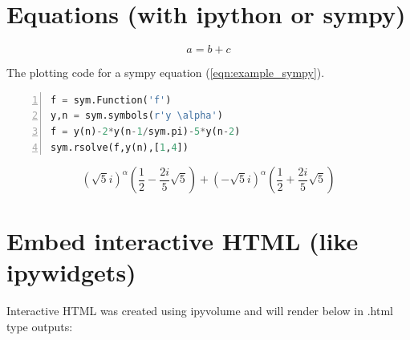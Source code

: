 \documentclass[10pt,parskip=half,
	toc=sectionentrywithdots,
	bibliography=totocnumbered,
	captions=tableheading,numbers=noendperiod]{scrartcl}
\begin{document}
\section{Equations (with ipython or
sympy)}\label{equations-with-ipython-or-sympy}

    \begin{equation}\label{eqn:example_ipy}	
    	 a = b+c 
        \end{equation}

\begin{codecell}[H]

    \caption{The plotting code for a sympy equation (\cref{eqn:example_sympy}).}\label{code:example_sym}\begin{lstlisting}[language=Python,numbers=left,xleftmargin=20pt,xrightmargin=5pt,belowskip=5pt,aboveskip=5pt]
f = sym.Function('f')
y,n = sym.symbols(r'y \alpha')
f = y(n)-2*y(n-1/sym.pi)-5*y(n-2)
sym.rsolve(f,y(n),[1,4])
\end{lstlisting}\end{codecell}

    \begin{equation}\label{eqn:example_sympy}	
    	\left(\sqrt{5} i\right)^{\alpha} \left(\frac{1}{2} - \frac{2 i}{5} \sqrt{5}\right) + \left(- \sqrt{5} i\right)^{\alpha} \left(\frac{1}{2} + \frac{2 i}{5} \sqrt{5}\right)
        \end{equation}

\section{Embed interactive HTML (like
ipywidgets)}\label{embed-interactive-html-like-ipywidgets}

Interactive HTML was created using ipyvolume and will render below in
.html type outputs:




	
\end{document}
